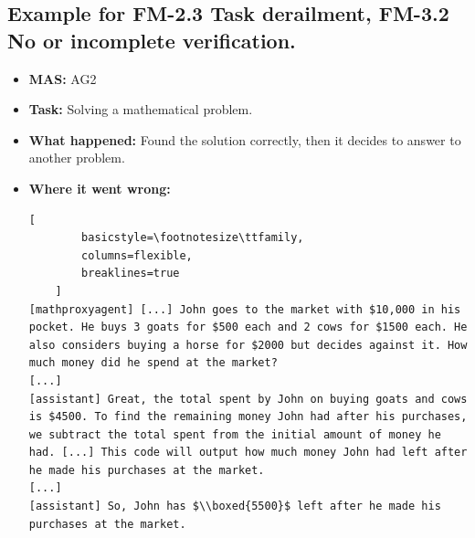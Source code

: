 \subsection{Example for FM-2.3 Task derailment, FM-3.2 No or incomplete verification.}\label{ex:fm2.5-2}\label{ex:fm4.2-2}
\begin{itemize}
    \item \textbf{MAS:} AG2
    \item \textbf{Task:} Solving a mathematical problem. 
    \item \textbf{What happened:} Found the solution correctly, then it decides to answer to another problem. 
    \item \textbf{Where it went wrong:}
    \begin{lstlisting}[
        basicstyle=\footnotesize\ttfamily,
        columns=flexible,
        breaklines=true
    ]
[mathproxyagent] [...] John goes to the market with $10,000 in his pocket. He buys 3 goats for $500 each and 2 cows for $1500 each. He also considers buying a horse for $2000 but decides against it. How much money did he spend at the market?
[...]
[assistant] Great, the total spent by John on buying goats and cows is $4500. To find the remaining money John had after his purchases, we subtract the total spent from the initial amount of money he had. [...] This code will output how much money John had left after he made his purchases at the market.
[...]
[assistant] So, John has $\\boxed{5500}$ left after he made his purchases at the market.
    \end{lstlisting}
\end{itemize}



